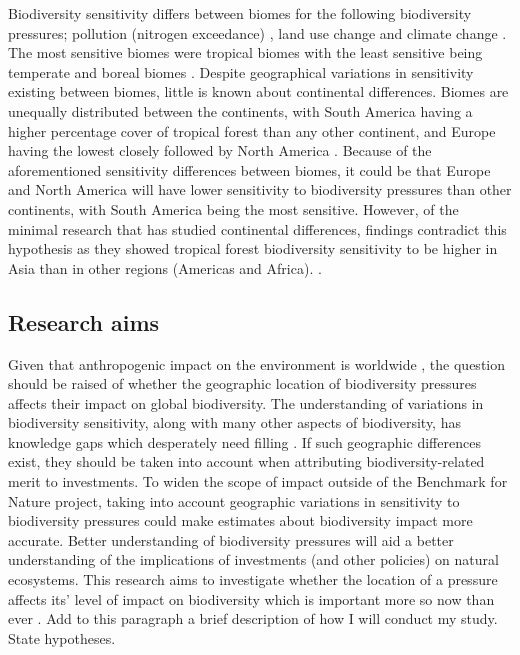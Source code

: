\documentclass[11pt, a4paper, titlepage]{article}
\begin{document}
   	 Biodiversity sensitivity differs between biomes for the following biodiversity pressures; pollution (nitrogen exceedance) \citep{alkemade2009globio3}, land use change and climate change \citep{newbold2020tropical}. The most sensitive biomes were tropical biomes \citep{barlow2016anthropogenic} with the least sensitive being temperate and boreal biomes \citep{newbold2020tropical} \citep{cazalis2021mismatch} \citep{barlow2016anthropogenic}. Despite geographical variations in sensitivity existing between biomes, little is known about continental differences. Biomes are unequally distributed between the continents, with South America having a higher percentage cover of tropical forest than any other continent, and Europe having the lowest closely followed by North America \citep{wade2003distribution}.  Because of the aforementioned sensitivity differences between biomes, it could be that Europe and North America will have lower sensitivity to biodiversity pressures than other continents, with South America being the most sensitive. However, of the minimal research that has studied continental differences, findings contradict this hypothesis as they showed tropical forest biodiversity sensitivity to be higher in Asia than in other regions (Americas and Africa). \citep{gibson2011primary}. 
   	
   	\subsection*{Research aims}
   	
   	 Given that anthropogenic impact on the environment is worldwide \citep{plumptre2021might}, the question should be raised of whether the geographic location of biodiversity pressures affects their impact on global biodiversity. The understanding of variations in biodiversity sensitivity, along with many other aspects of biodiversity, has knowledge gaps which desperately need filling \citep{pereira2012global}. If such geographic differences exist, they should be taken into account when attributing biodiversity-related merit to investments. To widen the scope of impact outside of the Benchmark for Nature project, taking into account geographic variations in sensitivity to biodiversity pressures could make estimates about biodiversity impact more accurate. Better understanding of biodiversity pressures will aid a better understanding of the implications of investments (and other policies) on natural ecosystems.  This research aims to investigate whether the location of a pressure affects its' level of impact on biodiversity which is important more so now than ever \citep{ceballos2015accelerated}. Add to this paragraph a brief description of how I will conduct my study. State hypotheses. \newline
\end{document}
